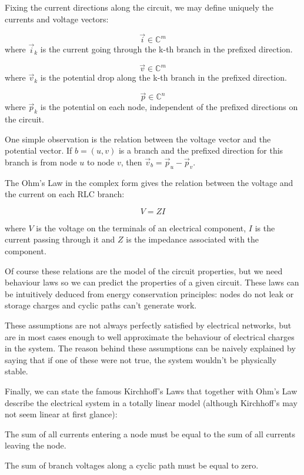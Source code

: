 \documentclass{comjnl}
\begin{document}
Fixing the current directions along the circuit, we may define uniquely the currents and voltage vectors:
\begin{definition}
$$ \vec{i} \in \mathbb{C}^m$$ where $\vec{i}_k$ is the current going through the k-th branch in the prefixed direction.
\end{definition}
\begin{definition}
$$ \vec{v} \in \mathbb{C}^m$$ where $\vec{v}_k$ is the potential drop along the k-th branch in the prefixed direction.
\end{definition}
\begin{definition}
$$ \vec{p} \in \mathbb{C}^n$$ where $\vec{p}_k$ is the potential on each node, independent of the prefixed directions on the circuit.
\end{definition}

One simple observation is the relation between the voltage vector and the potential vector. If $b=(u,v)$ is a branch and the prefixed direction for this branch is from node $u$ to node $v$, then $\vec{v}_b = \vec{p}_u - \vec{p}_v$. 

The Ohm's Law in the complex form gives the relation between the voltage and the current on each RLC branch:
\begin{axiom}[Ohm]
$$V = ZI $$
\end{axiom}
where $V$ is the voltage on the terminals of an electrical component, $I$ is the current passing through it and $Z$ is the impedance associated with the component. 

Of course these relations are the model of the circuit properties, but we need behaviour laws so we can predict the properties of a given circuit. These laws can be intuitively deduced from energy conservation principles: nodes do not leak or storage charges and cyclic paths can't generate work.

These assumptions are not always perfectly satisfied by electrical networks, but are in most cases enough to well approximate the behaviour of electrical charges in the system. The reason behind these assumptions can be naively explained by saying that if one of these were not true, the system wouldn't be physically stable.

Finally, we can state the famous Kirchhoff's Laws that together with Ohm's Law describe the electrical system in a totally linear model (although Kirchhoff's may not seem linear at first glance):
\begin{axiom}
The sum of all currents entering a node must be equal to the sum of all currents leaving the node.
\end{axiom}
\begin{axiom}
The sum of branch voltages along a cyclic path must be equal to zero.
\end{axiom}
\end{document}
